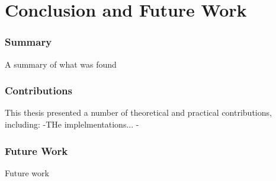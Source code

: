 \chapter{Conclusion and Future Work} \label{chap:conclusion}

\subsection{Summary}  \label{subSec:summary}

A summary of what was found

\subsection{Contributions}  \label{subSec:contributions}

This thesis presented a number of theoretical and practical contributions, including:
-THe implelmentations...
-

\subsection{Future Work}  \label{subSec:futureWork}

Future work